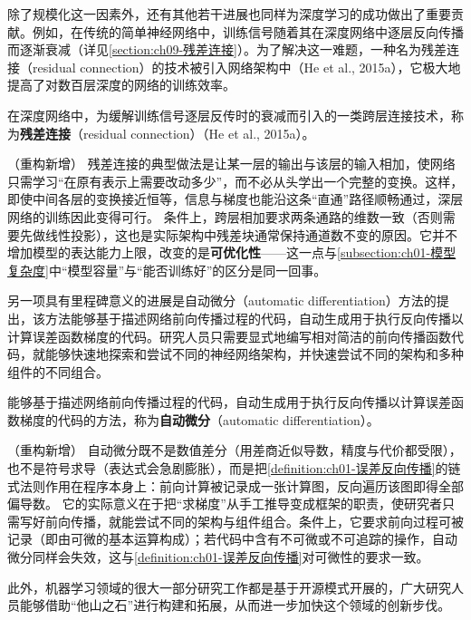 \documentclass[../../main.tex]{subfiles}
\begin{document}
除了规模化这一因素外，还有其他若干进展也同样为深度学习的成功做出了重要贡献。例如，在传统的简单神经网络中，训练信号随着其在深度网络中逐层反向传播而逐渐衰减（详见\cref{section:ch09-残差连接}）。为了解决这一难题，一种名为残差连接（residual connection）的技术被引入网络架构中（He et al., 2015a），它极大地提高了对数百层深度的网络的训练效率。

\begin{definition}[残差连接]\label{definition:ch01-残差连接}
在深度网络中，为缓解训练信号逐层反传时的衰减而引入的一类跨层连接技术，称为\textbf{残差连接}（residual connection）（He et al., 2015a）。
\end{definition}

\begin{remark}（重构新增）
残差连接的典型做法是让某一层的输出与该层的输入相加，使网络只需学习“在原有表示上需要改动多少”，而不必从头学出一个完整的变换。这样，即使中间各层的变换接近恒等，信息与梯度也能沿这条“直通”路径顺畅通过，深层网络的训练因此变得可行。
条件上，跨层相加要求两条通路的维数一致（否则需要先做线性投影），这也是实际架构中残差块通常保持通道数不变的原因。它并不增加模型的表达能力上限，改变的是\textbf{可优化性}——这一点与\cref{subsection:ch01-模型复杂度}中“模型容量”与“能否训练好”的区分是同一回事。
\end{remark}

另一项具有里程碑意义的进展是自动微分（automatic differentiation）方法的提出，该方法能够基于描述网络前向传播过程的代码，自动生成用于执行反向传播以计算误差函数梯度的代码。研究人员只需要显式地编写相对简洁的前向传播函数代码，就能够快速地探索和尝试不同的神经网络架构，并快速尝试不同的架构和多种组件的不同组合。

\begin{definition}[自动微分]\label{definition:ch01-自动微分}
能够基于描述网络前向传播过程的代码，自动生成用于执行反向传播以计算误差函数梯度的代码的方法，称为\textbf{自动微分}（automatic differentiation）。
\end{definition}

\begin{remark}（重构新增）
自动微分既不是数值差分（用差商近似导数，精度与代价都受限），也不是符号求导（表达式会急剧膨胀），而是把\cref{definition:ch01-误差反向传播}的链式法则作用在程序本身上：前向计算被记录成一张计算图，反向遍历该图即得全部偏导数。
它的实际意义在于把“求梯度”从手工推导变成框架的职责，使研究者只需写好前向传播，就能尝试不同的架构与组件组合。条件上，它要求前向过程可被记录（即由可微的基本运算构成）；若代码中含有不可微或不可追踪的操作，自动微分同样会失效，这与\cref{definition:ch01-误差反向传播}对可微性的要求一致。
\end{remark}

此外，机器学习领域的很大一部分研究工作都是基于开源模式开展的，广大研究人员能够借助“他山之石”进行构建和拓展，从而进一步加快这个领域的创新步伐。
\end{document}
